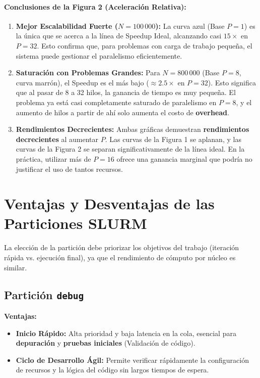 \documentclass{article}
\begin{document}
\paragraph{Conclusiones de la Figura 2 (Aceleración Relativa):}
\begin{enumerate}
    \item \textbf{Mejor Escalabilidad Fuerte ($N=100\,000$):} La curva azul (Base $P=1$) es la única que se acerca a la línea de Speedup Ideal, alcanzando casi $15\times$ en $P=32$. Esto confirma que, para problemas con carga de trabajo pequeña, el sistema puede gestionar el paralelismo eficientemente.
    \item \textbf{Saturación con Problemas Grandes:} Para $N=800\,000$ (Base $P=8$, curva marrón), el Speedup es el más bajo ($\approx 2.5\times$ en $P=32$). Esto significa que al pasar de 8 a 32 hilos, la ganancia de tiempo es muy pequeña. El problema ya está casi completamente saturado de paralelismo en $P=8$, y el aumento de hilos a partir de ahí solo aumenta el costo de \textbf{overhead}.
    \item \textbf{Rendimientos Decrecientes:} Ambas gráficas demuestran \textbf{rendimientos decrecientes} al aumentar $P$. Las curvas de la Figura 1 se aplanan, y las curvas de la Figura 2 se separan significativamente de la línea ideal. En la práctica, utilizar más de $P=16$ ofrece una ganancia marginal que podría no justificar el uso de tantos recursos.
\end{enumerate}

\section{Ventajas y Desventajas de las Particiones SLURM}

La elección de la partición debe priorizar los objetivos del trabajo (iteración rápida vs. ejecución final), ya que el rendimiento de cómputo por núcleo es similar.

\subsection{Partición \texttt{debug}}
\textbf{Ventajas:}
\begin{itemize}
    \item \textbf{Inicio Rápido:} Alta prioridad y baja latencia en la cola, esencial para \textbf{depuración} y \textbf{pruebas iniciales} (Validación de código).
    \item \textbf{Ciclo de Desarrollo Ágil:} Permite verificar rápidamente la configuración de recursos y la lógica del código sin largos tiempos de espera.
\end{itemize}
\end{document}
